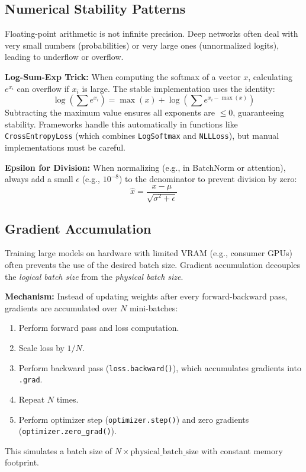 \documentclass[12pt,a4paper]{report}
\begin{document}
\subsection{Numerical Stability Patterns}
Floating-point arithmetic is not infinite precision. Deep networks often deal with very small numbers (probabilities) or very large ones (unnormalized logits), leading to underflow or overflow.

\textbf{Log-Sum-Exp Trick:}
When computing the softmax of a vector $x$, calculating $e^{x_i}$ can overflow if $x_i$ is large. The stable implementation uses the identity:
$$ \log \left( \sum e^{x_i} \right) = \max(x) + \log \left( \sum e^{x_i - \max(x)} \right) $$
Subtracting the maximum value ensures all exponents are $\le 0$, guaranteeing stability. Frameworks handle this automatically in functions like \texttt{CrossEntropyLoss} (which combines \texttt{LogSoftmax} and \texttt{NLLLoss}), but manual implementations must be careful.

\textbf{Epsilon for Division:}
When normalizing (e.g., in BatchNorm or attention), always add a small $\epsilon$ (e.g., $10^{-8}$) to the denominator to prevent division by zero:
$$ \hat{x} = \frac{x - \mu}{\sqrt{\sigma^2 + \epsilon}} $$

\subsection{Gradient Accumulation}
Training large models on hardware with limited VRAM (e.g., consumer GPUs) often prevents the use of the desired batch size. Gradient accumulation decouples the \textit{logical batch size} from the \textit{physical batch size}.

\textbf{Mechanism:}
Instead of updating weights after every forward-backward pass, gradients are accumulated over $N$ mini-batches:
\begin{enumerate}
    \item Perform forward pass and loss computation.
    \item Scale loss by $1/N$.
    \item Perform backward pass (\texttt{loss.backward()}), which accumulates gradients into \texttt{.grad}.
    \item Repeat $N$ times.
    \item Perform optimizer step (\texttt{optimizer.step()}) and zero gradients (\texttt{optimizer.zero\_grad()}).
\end{enumerate}
This simulates a batch size of $N \times \text{physical\_batch\_size}$ with constant memory footprint.
\end{document}
